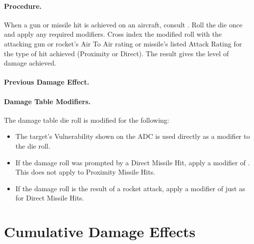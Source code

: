 \paragraph{Procedure.} When a gun or missile hit is achieved on an aircraft, consult . Roll the die once and apply any required modifiers. Cross index the modified roll with the attacking gun or rocket's Air To Air rating or missile's listed Attack Rating for the type of hit achieved (Proximity or Direct). The result gives the level of damage achieved.

\paragraph{Previous Damage Effect.} 

\paragraph{Damage Table Modifiers.} The damage table die roll is modified for the following:

\begin{itemize}

    \item{} The target's Vulnerability shown on the ADC is used directly as a modifier to the die roll.
    
    \item{} If the damage roll was prompted by a Direct Missile Hit, apply a modifier of . This does not apply to Proximity Missile Hits.
    
    \item{} If the damage roll is the result of a rocket attack, apply a modifier of  just as for Direct Missile Hits.
    
\end{itemize}


\section{Cumulative Damage Effects}

